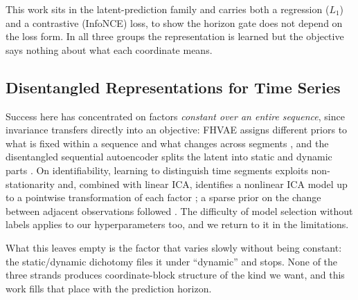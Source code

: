 This work sits in the latent-prediction family and carries both a regression ($L_1$) and a contrastive (InfoNCE) loss, to show the horizon gate does not depend on the loss form. In all three groups the representation is learned but the objective says nothing about what each coordinate means.

\subsection{Disentangled Representations for Time Series}
\label{sec:disent}

Success here has concentrated on factors \emph{constant over an entire sequence}, since invariance transfers directly into an objective: FHVAE assigns different priors to what is fixed within a sequence and what changes across segments \citep{hsu2017}, and the disentangled sequential autoencoder splits the latent into static and dynamic parts \citep{li2018}. On identifiability, learning to distinguish time segments exploits non-stationarity and, combined with linear ICA, identifies a nonlinear ICA model up to a pointwise transformation of each factor \citep{hyvarinen2016}; a sparse prior on the change between adjacent observations followed \citep{klindt2021}. The difficulty of model selection without labels \citep{locatello2019} applies to our hyperparameters too, and we return to it in the limitations.

What this leaves empty is the factor that varies slowly without being constant: the static/dynamic dichotomy files it under ``dynamic'' and stops. None of the three strands produces coordinate-block structure of the kind we want, and this work fills that place with the prediction horizon.
